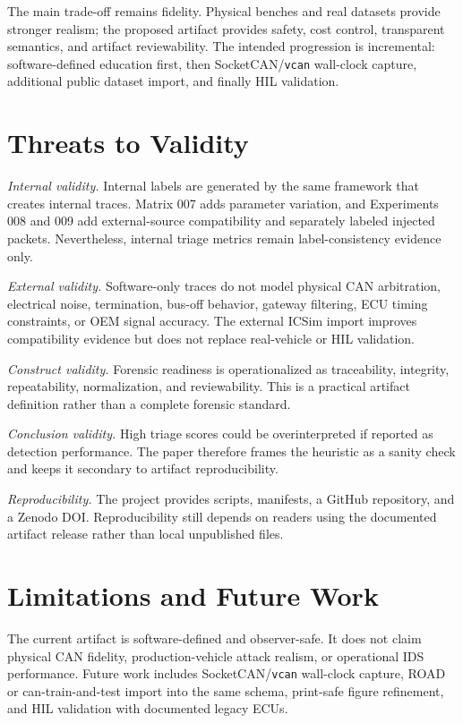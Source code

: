 \documentclass[conference]{IEEEtran}
\begin{document}
The main trade-off remains fidelity. Physical benches and real datasets provide stronger realism; the proposed artifact provides safety, cost control, transparent semantics, and artifact reviewability. The intended progression is incremental: software-defined education first, then SocketCAN/\texttt{vcan} wall-clock capture, additional public dataset import, and finally HIL validation.

\section{Threats to Validity}
\textit{Internal validity.} Internal labels are generated by the same framework that creates internal traces. Matrix 007 adds parameter variation, and Experiments 008 and 009 add external-source compatibility and separately labeled injected packets. Nevertheless, internal triage metrics remain label-consistency evidence only.

\textit{External validity.} Software-only traces do not model physical CAN arbitration, electrical noise, termination, bus-off behavior, gateway filtering, ECU timing constraints, or OEM signal accuracy. The external ICSim import improves compatibility evidence but does not replace real-vehicle or HIL validation.

\textit{Construct validity.} Forensic readiness is operationalized as traceability, integrity, repeatability, normalization, and reviewability. This is a practical artifact definition rather than a complete forensic standard.

\textit{Conclusion validity.} High triage scores could be overinterpreted if reported as detection performance. The paper therefore frames the heuristic as a sanity check and keeps it secondary to artifact reproducibility.

\textit{Reproducibility.} The project provides scripts, manifests, a GitHub repository, and a Zenodo DOI. Reproducibility still depends on readers using the documented artifact release rather than local unpublished files.

\section{Limitations and Future Work}
The current artifact is software-defined and observer-safe. It does not claim physical CAN fidelity, production-vehicle attack realism, or operational IDS performance. Future work includes SocketCAN/\texttt{vcan} wall-clock capture, ROAD or can-train-and-test import into the same schema, print-safe figure refinement, and HIL validation with documented legacy ECUs.
\end{document}
